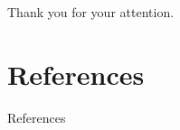 \documentclass[xcolor={svgnames},compress,aspectratio=169]{beamer}
\begin{document}
\begin{frame}
    \begin{center}
        {\large Thank you for your attention.}
    \end{center}
\end{frame}

\section*{References}

\begin{frame}[allowframebreaks]{References}
    
    {\footnotesize }
\end{frame}
\end{document}

